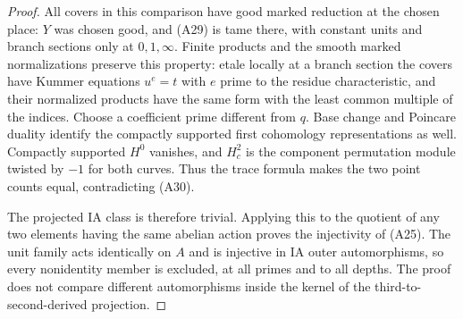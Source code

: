 \documentclass[11pt,oneside]{article}
\begin{document}
\begin{proof}
All covers in this comparison have good marked reduction
at the chosen place: $Y$ was chosen good, and (A29) is
tame there, with constant units and branch sections only
at $0,1,\infty$. Finite products and the smooth marked
normalizations preserve this property: etale locally at
a branch section the covers have Kummer equations
$u^e=t$ with $e$ prime to the residue characteristic,
and their normalized products have the same form with
the least common multiple of the indices. Choose a
coefficient prime different from $q$. Base change and
Poincare duality identify the compactly supported first
cohomology representations as well. Compactly supported
$H^0$ vanishes, and $H^2_c$ is the component permutation
module twisted by $-1$ for both curves. Thus the trace
formula makes the two point counts equal, contradicting
(A30).

The projected IA class is therefore trivial. Applying
this to the quotient of any two elements having the
same abelian action proves the injectivity of (A25).
The unit family acts identically on $A$ and is injective
in IA outer automorphisms, so every nonidentity member
is excluded, at all primes and to all depths. The proof
does not compare different automorphisms inside the
kernel of the third-to-second-derived projection.
\end{proof}
\end{document}
